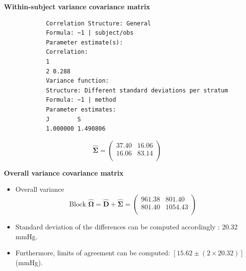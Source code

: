 \documentclass[compress]{beamer}        %
\makeatletter
\newcommand{\tcb}{\textcolor{beamer@blendedblue}}
\makeatother
\begin{document}
		\begin{frame}[fragile]{\bf \tcb{Within-subject variance covariance matrix}}
			\begin{verbatim}
			Correlation Structure: General
			Formula: ~1 | subject/obs
			Parameter estimate(s):
			Correlation:
			1
			2 0.288
			Variance function:
			Structure: Different standard deviations per stratum
			Formula: ~1 | method
			Parameter estimates:
			J        S
			1.000000 1.490806
			\end{verbatim}
			\[
			\hat{\boldsymbol{\Sigma}} = \left(
			\begin{array}{cc}
			37.40 & 16.06 \\
			16.06 & 83.14 \\
			\end{array}\right)
			\]
		\end{frame}
		\begin{frame}[fragile]{\bf \tcb{Overall variance covariance matrix}}
			\large
			\begin{itemize}\itemsep0.7cm
				\item Overall variance \[
				\mbox{Block }\hat{\boldsymbol{\Omega}} = \hat{\boldsymbol{D}} + \hat{\boldsymbol{\Sigma}} =
				\left(
				\begin{array}{cc}
				961.38 & 801.40 \\
				801.40 & 1054.43 \\
				\end{array}
				\right)
				\]
				
				\item Standard deviation of the differences can be computed accordingly : 20.32 mmHg.
				
				\item Furthermore, limits of agreement can be computed: $[15.62 \pm (2 \times 20.32) ]$ (mmHg).
			\end{itemize}
		\end{frame}
		
		
\end{document}
